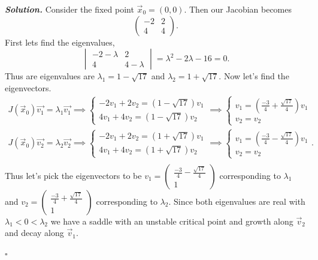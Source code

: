 \documentclass[12pt]{report}
\newenvironment{solution}[1][\it{Solution}]{\textbf{#1. } }{$\square$}
\newcommand{\paren}[1]{{\left(#1\right)}} %
\begin{document}
\begin{solution}
    \noindent
    Consider the fixed point $\vec{x}_0 = (0,0)$. Then our Jacobian becomes
    \[ 
        \begin{pmatrix}
            -2 & 2 \\
            4 & 4  
        \end{pmatrix}.
    \]
    First lets find the eigenvalues,
    \[ 
        \begin{vmatrix}
            -2 - \lambda & 2 \\
            4 & 4 - \lambda 
        \end{vmatrix} = \lambda^2 - 2\lambda - 16 = 0.
    \]
    Thus are eigenvalues are $\lambda_1 = 1 - \sqrt{17}$ and $\lambda_2 = 1 + \sqrt{17}$. Now let's find the eigenvectors.
    \begin{align*}
        J(\vec{x}_0)\vec{v_1} = \lambda_1 \vec{v_1} \implies \begin{cases}
            -2v_1 + 2v_2 = (1 - \sqrt{17})v_1\\
            4v_1 + 4v_2 = (1 - \sqrt{17})v_2
        \end{cases} \implies
        \begin{cases}
            v_1 = \paren{\frac{-3}{4} + \frac{\sqrt{17}}{4}}v_1\\
            v_2 = v_2
        \end{cases}\\
        J(\vec{x}_0)\vec{v_2} = \lambda_2 \vec{v_2} \implies \begin{cases}
            -2v_1 + 2v_2 = (1 + \sqrt{17})v_1\\
            4v_1 + 4v_2 = (1 + \sqrt{17})v_2
        \end{cases} \implies
        \begin{cases}
            v_1 = \paren{\frac{-3}{4} - \frac{\sqrt{17}}{4}}v_1\\
            v_2 = v_2
        \end{cases}.\\
    \end{align*}
    Thus let's pick the eigenvectors to be $v_1 = \begin{pmatrix}
        \frac{-3}{4} - \frac{\sqrt{17}}{4}\\1
    \end{pmatrix}$ corresponding to $\lambda_1$ and $v_2 = \begin{pmatrix}
        \frac{-3}{4} + \frac{\sqrt{17}}{4}\\1
    \end{pmatrix}$ corresponding to $\lambda_2$. Since both eigenvalues are real with $\lambda_1 < 0 < \lambda_2$ we have a saddle with an unstable critical point and growth along $\vec{v}_2$ and decay along $\vec{v}_1$. 


\end{solution}
\end{document}
